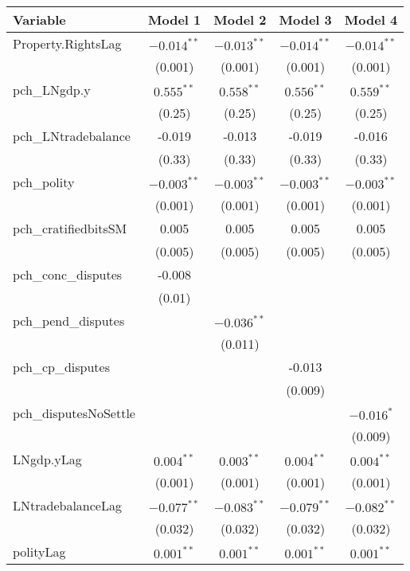 \begin{table}[ht]
\centering
\begin{tabular}{lcccc}
 Variable & Model 1 & Model 2 & Model 3 & Model 4 \\ 
  \hline
\hline
Property.RightsLag & $-0.014^{\ast\ast}$ & $-0.013^{\ast\ast}$ & $-0.014^{\ast\ast}$ & $-0.014^{\ast\ast}$ \\ 
   & (0.001) & (0.001) & (0.001) & (0.001) \\ 
   \hline
pch\_LNgdp.y & $0.555^{\ast\ast}$ & $0.558^{\ast\ast}$ & $0.556^{\ast\ast}$ & $0.559^{\ast\ast}$ \\ 
   & (0.25) & (0.25) & (0.25) & (0.25) \\ 
  pch\_LNtradebalance & -0.019 & -0.013 & -0.019 & -0.016 \\ 
   & (0.33) & (0.33) & (0.33) & (0.33) \\ 
  pch\_polity & $-0.003^{\ast\ast}$ & $-0.003^{\ast\ast}$ & $-0.003^{\ast\ast}$ & $-0.003^{\ast\ast}$ \\ 
   & (0.001) & (0.001) & (0.001) & (0.001) \\ 
  pch\_cratifiedbitsSM & 0.005 & 0.005 & 0.005 & 0.005 \\ 
   & (0.005) & (0.005) & (0.005) & (0.005) \\ 
  pch\_conc\_disputes & -0.008 &  &  &  \\ 
   & (0.01) &  &  &  \\ 
  pch\_pend\_disputes &  & $-0.036^{\ast\ast}$ &  &  \\ 
   &  & (0.011) &  &  \\ 
  pch\_cp\_disputes &  &  & -0.013 &  \\ 
   &  &  & (0.009) &  \\ 
  pch\_disputesNoSettle &  &  &  & $-0.016^{\ast}$ \\ 
   &  &  &  & (0.009) \\ 
   \hline
LNgdp.yLag & $0.004^{\ast\ast}$ & $0.003^{\ast\ast}$ & $0.004^{\ast\ast}$ & $0.004^{\ast\ast}$ \\ 
   & (0.001) & (0.001) & (0.001) & (0.001) \\ 
  LNtradebalanceLag & $-0.077^{\ast\ast}$ & $-0.083^{\ast\ast}$ & $-0.079^{\ast\ast}$ & $-0.082^{\ast\ast}$ \\ 
   & (0.032) & (0.032) & (0.032) & (0.032) \\ 
  polityLag & $0.001^{\ast\ast}$ & $0.001^{\ast\ast}$ & $0.001^{\ast\ast}$ & $0.001^{\ast\ast}$ \\ 

\end{tabular}
\end{table}
